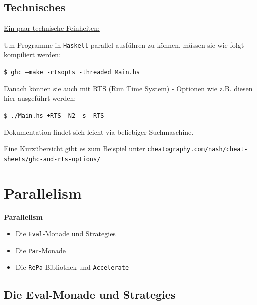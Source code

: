 \documentclass{beamer}
\begin{document}
\subsection{Technisches}

\begin{frame}[fragile]
\underline{Ein paar technische Feinheiten:}\pause\bigskip

Um Programme in \texttt{Haskell} parallel ausführen zu können, müssen sie wie folgt
kompiliert werden:\smallskip

\texttt{\$ ghc --make -rtsopts -threaded Main.hs}
\pause
\bigskip

Danach können sie auch mit RTS (Run Time System) - Optionen wie z.B. diesen hier ausgeführt werden:\smallskip

\texttt{\$ ./Main.hs +RTS -N2 -s -RTS}
\bigskip
\pause

Dokumentation findet sich leicht via beliebiger Suchmaschine.

Eine Kurzübersicht gibt es zum Beispiel unter \texttt{cheatography.com/nash/cheat-sheets/ghc-and-rts-options/}

\end{frame}


\section{Parallelism}

\begin{frame}

\begin{center}
\Large
\textbf{Parallelism}\normalsize\bigskip

\begin{itemize}
\item Die \texttt{Eval}-Monade und Strategies
\item Die \texttt{Par}-Monade
\item Die \texttt{RePa}-Bibliothek und \texttt{Accelerate}
\end{itemize}
\end{center}

\end{frame}


\subsection{Die Eval-Monade und Strategies}
\end{document}
